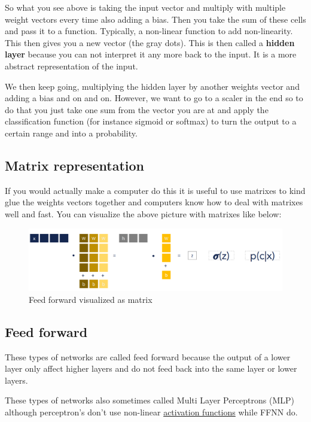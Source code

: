 \documentclass[
  11pt,
  british,
]{article}
\begin{document}
So what you see above is taking the input vector and multiply with
multiple weight vectors every time also adding a bias. Then you take the
sum of these cells and pass it to a function. Typically, a non-linear
function to add non-linearity. This then gives you a new vector (the
gray dots). This is then called a \textbf{hidden layer} because you can
not interpret it any more back to the input. It is a more abstract
representation of the input.

We then keep going, multiplying the hidden layer by another weights
vector and adding a bias and on and on. However, we want to go to a
scaler in the end so to do that you just take one sum from the vector
you are at and apply the classification function (for instance sigmoid
or softmax) to turn the output to a certain range and into a
probability.

\hypertarget{matrix-representation}{%
\subsection{Matrix representation}\label{matrix-representation}}

If you would actually make a computer do this it is useful to use
matrixes to kind glue the weights vectors together and computers know
how to deal with matrixes well and fast. You can visualize the above
picture with matrixes like below:

\begin{figure}
\centering
\includegraphics{Pasted_image_20220603203248.png}
\caption{Feed forward visualized as matrix}
\end{figure}

\hypertarget{feed-forward}{%
\subsection{Feed forward}\label{feed-forward}}

These types of networks are called feed forward because the output of a
lower layer only affect higher layers and do not feed back into the same
layer or lower layers.

These types of networks also sometimes called Multi Layer Perceptrons
(MLP) although perceptron's don't use non-linear
\href{Logistic\%20Regression.md}{activation functions} while FFNN do.
\end{document}
